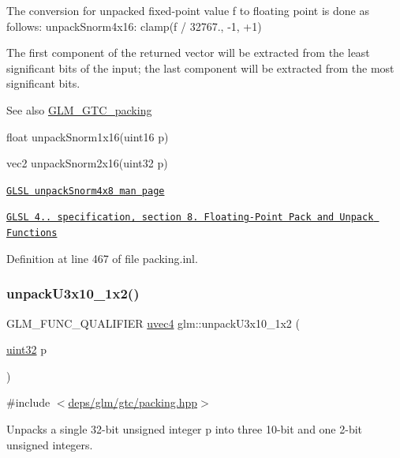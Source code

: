 The conversion for unpacked fixed-\/point value f to floating point is done as follows\+: unpack\+Snorm4x16\+: clamp(f / 32767., -\/1, +1)

The first component of the returned vector will be extracted from the least significant bits of the input; the last component will be extracted from the most significant bits.

\begin{DoxySeeAlso}{See also}
\hyperlink{group__gtc__packing}{G\+L\+M\+\_\+\+G\+T\+C\+\_\+packing} 

float unpack\+Snorm1x16(uint16 p) 

vec2 unpack\+Snorm2x16(uint32 p) 

\href{http://www.opengl.org/sdk/docs/manglsl/xhtml/unpackSnorm2x16.xml}{\tt G\+L\+SL unpack\+Snorm4x8 man page} 

\href{http://www.opengl.org/registry/doc/GLSLangSpec.4.20.8.pdf}{\tt G\+L\+SL 4.. specification, section 8. Floating-\/\+Point Pack and Unpack Functions} 
\end{DoxySeeAlso}


Definition at line 467 of file packing.\+inl.

\mbox{\label{group__gtc__packing_ga119aa2d7d55952f9dc4214390a6ffefc}} 
\subsubsection{\texorpdfstring{unpack\+U3x10\+\_\+1x2()}{unpackU3x10\_1x2()}}
{\footnotesize\ttfamily G\+L\+M\+\_\+\+F\+U\+N\+C\+\_\+\+Q\+U\+A\+L\+I\+F\+I\+ER \hyperlink{group__core__types_ga1c426d19627b32b14f0089f7f4ba7b1d}{uvec4} glm\+::unpack\+U3x10\+\_\+1x2 (\begin{DoxyParamCaption}\item[{\hyperlink{group__gtc__type__precision_ga202b6a53c105fcb7e531f9b443518451}{uint32}}]{p }\end{DoxyParamCaption})}



{\ttfamily \#include $<$\hyperlink{gtc_2packing_8hpp}{deps/glm/gtc/packing.\+hpp}$>$}

Unpacks a single 32-\/bit unsigned integer p into three 10-\/bit and one 2-\/bit unsigned integers.

